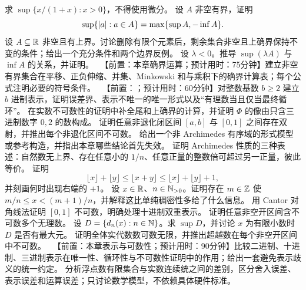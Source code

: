 \begin{enumerate}[label=\textbf{\thechapter.\arabic*.},resume]
  求 \(\sup\{x/(1+x):x>0\}\)，不得使用微分。
  设 \(A\) 非空有界，证明
 \[
  \sup\{\left|a\right|:a\in A\}=\max\{\sup A,-\inf A\}.
 \]
  设 \(A\subseteq\mathbb{R}\) 非空且有上界。讨论删除有限个元素后，剩余集合非空且上确界保持不变的条件；给出一个充分条件和两个边界反例。
  设 \(\lambda<0\)。推导 \(\sup(\lambda A)\) 与 \(\inf A\) 的关系，并证明。
  \ 【前置：本章确界运算；预计用时：75分钟】建立非空有界集合在平移、正负伸缩、并集、Minkowski 和与乘积下的确界计算表；每个公式注明必要的符号条件。
  \ 【前置：；预计用时：60分钟】对整数基数 \(b\ge2\) 建立 \(b\) 进制表示，证明误差界、表示不唯一的唯一形式以及“有理数当且仅当最终循环”。
  在实数不可数性的证明中补全尾和上确界的计算，并证明 \(\Phi\) 的像由只含三进制数字 \(0,2\) 的数构成。
  证明任意非退化闭区间 \([a,b]\) 与 \([0,1]\) 之间存在双射，并推出每个非退化区间不可数。
  给出一个非 Archimedes 有序域的形式模型或参考构造，并指出本章哪些结论首先失效。
  证明 Archimedes 性质的三种表述：自然数无上界、存在任意小的 \(1/n\)、任意正量的整数倍可超过另一正量，彼此等价。
  证明
 \[
  \lfloor x\rfloor+\lfloor y\rfloor
  \le\lfloor x+y\rfloor
  \le\lfloor x\rfloor+\lfloor y\rfloor+1,
 \]
 并刻画何时出现右端的 \(+1\)。
  设 \(x\in\mathbb{R}\)、\(n\in\mathbb{N}_{>0}\)。证明存在 \(m\in\mathbb{Z}\) 使 \(m/n\le x<(m+1)/n\)，并解释这比单纯稠密性多给了什么信息。
  用 Cantor 对角线法证明 \([0,1]\) 不可数，明确处理十进制双重表示。
  证明任意非空开区间含不可数多个无理数。
  设 \(D=\{d_n(x):n\in\mathbb{N}\}\)。求 \(\sup D\)，并讨论 \(x\) 为有限小数时 \(D\) 是否有最大元。
 证明全体实代数数可数无限，并推出超越数在每个非空开区间中不可数。
  \ 【前置：本章表示与可数性；预计用时：90分钟】比较二进制、十进制、三进制表示在唯一性、循环性与不可数性证明中的作用；给出一套避免表示歧义的统一约定。
  分析浮点数有限集合与实数连续统之间的差别，区分舍入误差、表示误差和运算误差；只讨论数学模型，不依赖具体硬件标准。
\end{enumerate}

